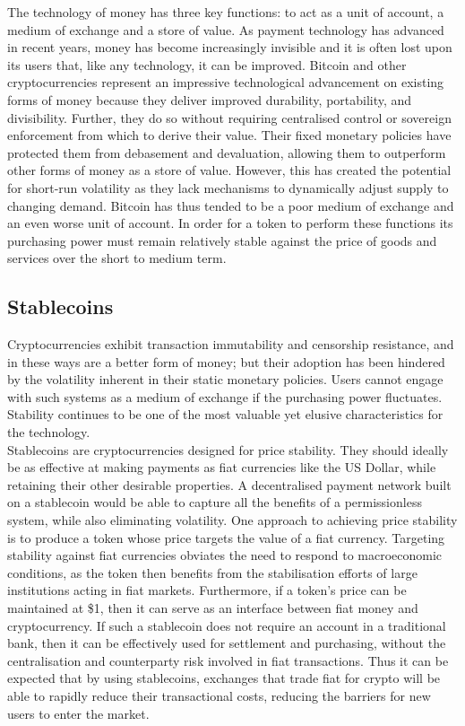 \noindent The technology of money has three key functions: to act as a unit
of account, a medium of exchange and a store of value. As payment technology
has advanced in recent years, money has become increasingly invisible and it
is often lost upon its users that, like any technology, it can be improved.
Bitcoin and other cryptocurrencies represent an impressive technological
advancement on existing forms of money because they deliver improved
durability, portability, and divisibility. Further, they do so without
requiring centralised control or sovereign enforcement from which to derive
their value. Their fixed monetary policies have protected them from
debasement and devaluation, allowing them to outperform other forms of money
as a store of value. However, this has created the potential for short-run
volatility as they lack mechanisms to dynamically adjust supply to changing
demand. Bitcoin has thus tended to be a poor medium of exchange and an even
worse unit of account. In order for a token to perform these functions its
purchasing power must remain relatively stable against the price of goods and
services over the short to medium term.

\subsection{Stablecoins}

\noindent Cryptocurrencies exhibit transaction immutability and censorship
resistance, and in these ways are a better form of money; but their adoption
has been hindered by the volatility inherent in their static monetary
policies. Users cannot engage with such systems as a medium of exchange if
the purchasing power fluctuates. Stability continues to be one of the most
valuable yet elusive characteristics for the technology. \\

\noindent Stablecoins are cryptocurrencies designed for price stability. They
should ideally be as effective at making payments as fiat currencies like the
US Dollar, while retaining their other desirable properties. A decentralised
payment network built on a stablecoin would be able to capture all the
benefits of a permissionless system, while also eliminating volatility. One
approach to achieving price stability is to produce a token whose price
targets the value of a fiat currency. Targeting stability against fiat
currencies obviates the need to respond to macroeconomic conditions, as the
token then benefits from the stabilisation efforts of large institutions
acting in fiat markets. Furthermore, if a token’s price can be maintained at
\$1, then it can serve as an interface between fiat money and cryptocurrency.
If such a stablecoin does not require an account in a traditional bank, then
it can be effectively used for settlement and purchasing, without the
centralisation and counterparty risk involved in fiat transactions. Thus it
can be expected that by using stablecoins, exchanges that trade fiat for
crypto will be able to rapidly reduce their transactional costs, reducing the
barriers for new users to enter the market.

